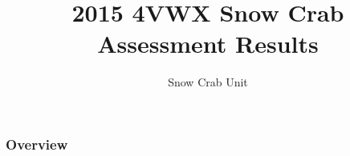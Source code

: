 \usepackage{graphicx} %
\usepackage{graphics}
\usepackage{booktabs} %

\newcommand{\e}{/home/michelle/ecomod_data/}
\newcommand{\es}{snowcrab/}
\newcommand{\Ay}{assessments/2015/}
\newcommand{\A}{assessments/}


\title{2015 4VWX Snow Crab Assessment Results} %

\author{Snow Crab Unit} %
\date{\the\year} %



\begin{frame}
\titlepage %
\end{frame}

\begin{frame}
\frametitle{Overview} %
\tableofcontents %
\end{frame}




